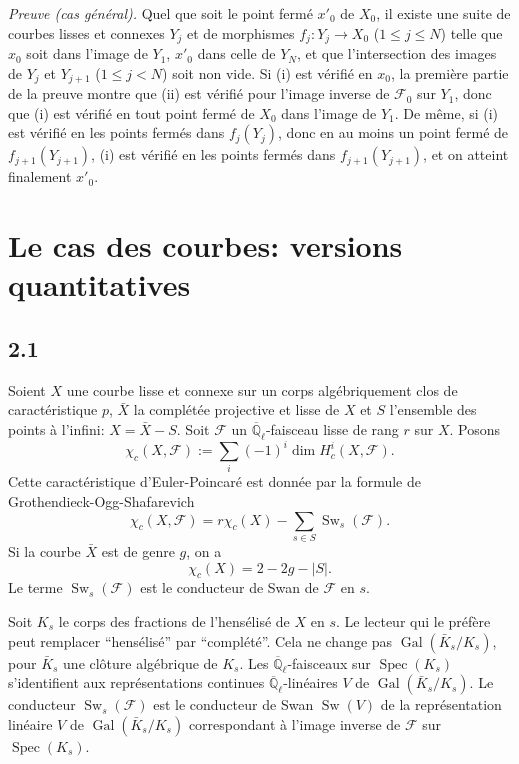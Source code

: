 \documentclass[10pt,a4paper]{article}
\theoremstyle{plain}
\theoremstyle{definition}
\DeclareMathOperator{\Spec}{Spec}
\DeclareMathOperator{\Gal}{Gal}
\DeclareMathOperator{\Sw}{Sw}
\begin{document}
\medskip
\noindent\textit{Preuve (cas g\'en\'eral).} Quel que soit le point ferm\'e $x'_0$ de $X_0$, il existe une suite de courbes lisses et connexes $Y_j$ et de morphismes $f_j: Y_j \to X_0$ ($1 \leq j \leq N$) telle que $x_0$ soit dans l'image de $Y_1$, $x'_0$ dans celle de $Y_N$, et que l'intersection des images de $Y_j$ et $Y_{j+1}$ ($1 \leq j < N$) soit non vide. Si (i) est v\'erifi\'e en $x_0$, la premi\`ere partie de la preuve montre que (ii) est v\'erifi\'e pour l'image inverse de $\mathcal{F}_0$ sur $Y_1$, donc que (i) est v\'erifi\'e en tout point ferm\'e de $X_0$ dans l'image de $Y_1$. De m\^eme, si (i) est v\'erifi\'e en les points ferm\'es dans $f_j(Y_j)$, donc en au moins un point ferm\'e de $f_{j+1}(Y_{j+1})$, (i) est v\'erifi\'e en les points ferm\'es dans $f_{j+1}(Y_{j+1})$, et on atteint finalement $x'_0$.


\section{Le cas des courbes: versions quantitatives}

\subsection*{2.1}

Soient $X$ une courbe lisse et connexe sur un corps alg\'ebriquement clos de caract\'eristique $p$, $\bar{X}$ la compl\'et\'ee projective et lisse de $X$ et $S$ l'ensemble des points \`a l'infini: $X = \bar{X} - S$. Soit $\mathcal{F}$ un $\overline{\mathbb{Q}}_\ell$-faisceau lisse de rang $r$ sur $X$. Posons
\[
\chi_c(X, \mathcal{F}) := \sum_i (-1)^i \dim H_c^i(X, \mathcal{F}).
\]
Cette caract\'eristique d'Euler-Poincar\'e est donn\'ee par la formule de Grothendieck-Ogg-Shafarevich
\begin{equation}\label{eq:2.1.1}
\chi_c(X, \mathcal{F}) = r\chi_c(X) - \sum_{s \in S} \Sw_s(\mathcal{F}).
\end{equation}
Si la courbe $\bar{X}$ est de genre $g$, on a
\begin{equation}\label{eq:2.1.2}
\chi_c(X) = 2 - 2g - |S|.
\end{equation}
Le terme $\Sw_s(\mathcal{F})$ est le conducteur de Swan de $\mathcal{F}$ en $s$.

Soit $K_s$ le corps des fractions de l'hens\'elis\'e de $X$ en $s$. Le lecteur qui le pr\'ef\`ere peut remplacer ``hens\'elis\'e'' par ``compl\'et\'e''. Cela ne change pas $\Gal(\bar{K}_s/K_s)$, pour $\bar{K}_s$ une cl\^oture alg\'ebrique de $K_s$. Les $\overline{\mathbb{Q}}_\ell$-faisceaux sur $\Spec(K_s)$ s'identifient aux repr\'esentations continues $\overline{\mathbb{Q}}_\ell$-lin\'eaires $V$ de $\Gal(\bar{K}_s/K_s)$. Le conducteur $\Sw_s(\mathcal{F})$ est le conducteur de Swan $\Sw(V)$ de la repr\'esentation lin\'eaire $V$ de $\Gal(\bar{K}_s/K_s)$ correspondant \`a l'image inverse de $\mathcal{F}$ sur $\Spec(K_s)$.
\end{document}
